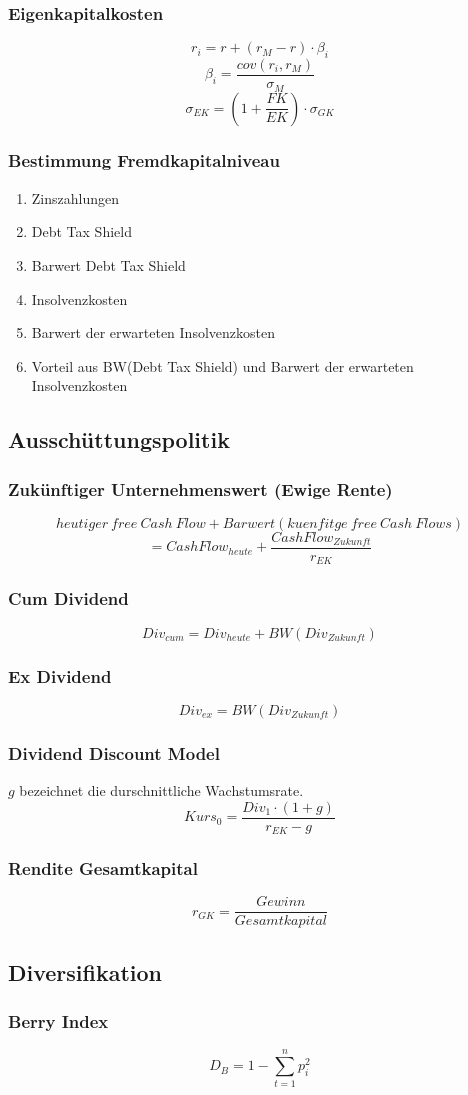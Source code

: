 \subsubsection{Eigenkapitalkosten}
\[r_i = r + (r_M - r) \cdot \beta_i\]
\[\beta_i = \frac{cov(r_i, r_M)}{\sigma_M}\]
\[\sigma_{EK} = (1 + \frac{FK}{EK}) \cdot \sigma_{GK}\]

\subsubsection{Bestimmung Fremdkapitalniveau}
\begin{enumerate}
	\item Zinszahlungen
	\item Debt Tax Shield
	\item Barwert Debt Tax Shield
	\item Insolvenzkosten
	\item Barwert der erwarteten Insolvenzkosten
	\item Vorteil aus BW(Debt Tax Shield) und Barwert der erwarteten Insolvenzkosten
\end{enumerate}


\subsection{Ausschüttungspolitik}

\subsubsection{Zukünftiger Unternehmenswert (Ewige Rente)}
\[heutiger~free~Cash~Flow + Barwert(kuenfitge~free~Cash~Flows)\]
\[= CashFlow_{heute} + \frac{CashFlow_{Zukunft}}{r_{EK}}\]

\subsubsection{Cum Dividend}
\[Div_{cum} = Div_{heute} + BW(Div_{Zukunft})\]

\subsubsection{Ex Dividend}
\[Div_{ex} = BW(Div_{Zukunft})\]

\subsubsection{Dividend Discount Model}
\(g\) bezeichnet die durschnittliche Wachstumsrate.
\[Kurs_{0} = \frac{Div_1 \cdot (1+g)}{r_{EK}-g}\]

\subsubsection{Rendite Gesamtkapital}
\[r_{GK} = \frac{Gewinn}{Gesamtkapital}\]


\subsection{Diversifikation}

\subsubsection{Berry Index}
\[D_B = 1 - \sum_{t=1}^{n} p_i^2\]
